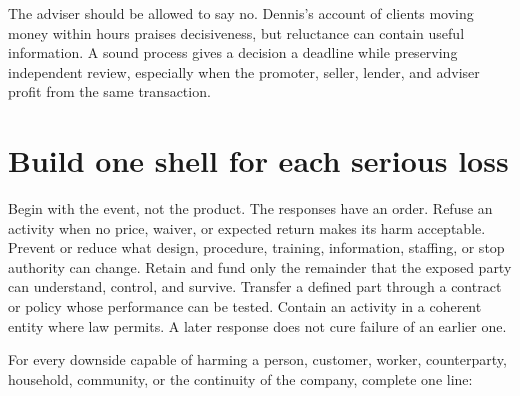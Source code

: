 The adviser should be allowed to say no. Dennis's account of clients moving
money within hours praises decisiveness, but reluctance can contain useful
information. A sound process gives a decision a deadline while preserving
independent review, especially when the promoter, seller, lender, and adviser
profit from the same transaction.

\section{Build one shell for each serious loss}

Begin with the event, not the product. The responses have an order. Refuse an
activity when no price, waiver, or expected return makes its harm acceptable.
Prevent or reduce what design, procedure, training, information, staffing, or
stop authority can change. Retain and fund only the remainder that the exposed
party can understand, control, and survive. Transfer a defined part through a
contract or policy whose performance can be tested. Contain an activity in a
coherent entity where law permits. A later response does not cure failure of an
earlier one.

For every downside capable of harming a person, customer, worker,
counterparty, household, community, or the continuity of the company, complete
one line:

